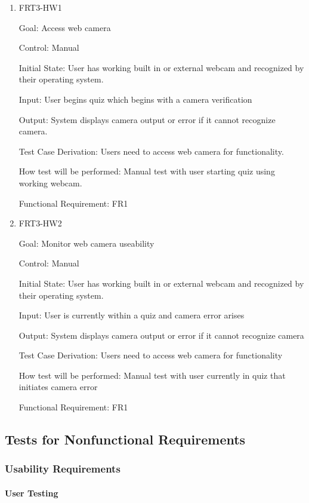 \documentclass[12pt, titlepage]{article}
\begin{document}
\begin{enumerate}

\item{FRT3-HW1}

Goal: Access web camera

Control: Manual
					
Initial State: User has working built in or external webcam and recognized by their operating system.
					
Input: User begins quiz which begins with a camera verification
					
Output: System displays camera output or error if it cannot recognize camera.

Test Case Derivation: Users need to access web camera for functionality.
					
How test will be performed: Manual test with user starting quiz using working webcam.

Functional Requirement: FR1

\item{FRT3-HW2}

Goal: Monitor web camera useability

Control: Manual
					
Initial State: User has working built in or external webcam and recognized by their operating system.
					
Input: User is currently within a quiz and camera error arises
					
Output: System displays camera output or error if it cannot recognize camera

Test Case Derivation: Users need to access web camera for functionality
					
How test will be performed: Manual test with user currently in quiz that initiates camera error

Functional Requirement: FR1

\end{enumerate}

\subsection{Tests for Nonfunctional Requirements}

\subsubsection{Usability Requirements}
		
\paragraph{User Testing}
\end{document}
